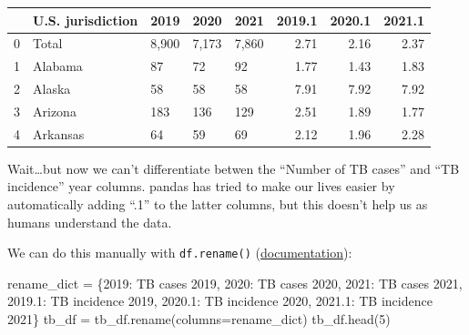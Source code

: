 \documentclass[
  letterpaper,
  DIV=11,
  numbers=noendperiod]{scrreprt}
\newenvironment{Shaded}{\begin{snugshade}}{\end{snugshade}}
\newcommand{\DecValTok}[1]{\textcolor[rgb]{0.68,0.00,0.00}{#1}}
\newcommand{\NormalTok}[1]{\textcolor[rgb]{0.00,0.23,0.31}{#1}}
\newcommand{\OperatorTok}[1]{\textcolor[rgb]{0.37,0.37,0.37}{#1}}
\newcommand{\StringTok}[1]{\textcolor[rgb]{0.13,0.47,0.30}{#1}}
\begin{document}
\begin{tabular}{lllllrrr}
\toprule
{} & U.S. jurisdiction &   2019 &   2020 &   2021 &  2019.1 &  2020.1 &  2021.1 \\
\midrule
0 &             Total &  8,900 &  7,173 &  7,860 &    2.71 &    2.16 &    2.37 \\
1 &           Alabama &     87 &     72 &     92 &    1.77 &    1.43 &    1.83 \\
2 &            Alaska &     58 &     58 &     58 &    7.91 &    7.92 &    7.92 \\
3 &           Arizona &    183 &    136 &    129 &    2.51 &    1.89 &    1.77 \\
4 &          Arkansas &     64 &     59 &     69 &    2.12 &    1.96 &    2.28 \\
\bottomrule
\end{tabular}

Wait\ldots but now we can't differentiate betwen the ``Number of TB
cases'' and ``TB incidence'' year columns. pandas has tried to make our
lives easier by automatically adding ``.1'' to the latter columns, but
this doesn't help us as humans understand the data.

We can do this manually with \texttt{df.rename()}
(\href{https://pandas.pydata.org/docs/reference/api/pandas.DataFrame.rename.html?highlight=rename\#pandas.DataFrame.rename}{documentation}):

\begin{Shaded}
\begin{Highlighting}[]
\NormalTok{rename\_dict }\OperatorTok{=}\NormalTok{ \{}\StringTok{\textquotesingle{}2019\textquotesingle{}}\NormalTok{: }\StringTok{\textquotesingle{}TB cases 2019\textquotesingle{}}\NormalTok{,}
               \StringTok{\textquotesingle{}2020\textquotesingle{}}\NormalTok{: }\StringTok{\textquotesingle{}TB cases 2020\textquotesingle{}}\NormalTok{,}
               \StringTok{\textquotesingle{}2021\textquotesingle{}}\NormalTok{: }\StringTok{\textquotesingle{}TB cases 2021\textquotesingle{}}\NormalTok{,}
               \StringTok{\textquotesingle{}2019.1\textquotesingle{}}\NormalTok{: }\StringTok{\textquotesingle{}TB incidence 2019\textquotesingle{}}\NormalTok{,}
               \StringTok{\textquotesingle{}2020.1\textquotesingle{}}\NormalTok{: }\StringTok{\textquotesingle{}TB incidence 2020\textquotesingle{}}\NormalTok{,}
               \StringTok{\textquotesingle{}2021.1\textquotesingle{}}\NormalTok{: }\StringTok{\textquotesingle{}TB incidence 2021\textquotesingle{}}\NormalTok{\}}
\NormalTok{tb\_df }\OperatorTok{=}\NormalTok{ tb\_df.rename(columns}\OperatorTok{=}\NormalTok{rename\_dict)}
\NormalTok{tb\_df.head(}\DecValTok{5}\NormalTok{)}
\end{Highlighting}
\end{Shaded}
\end{document}
